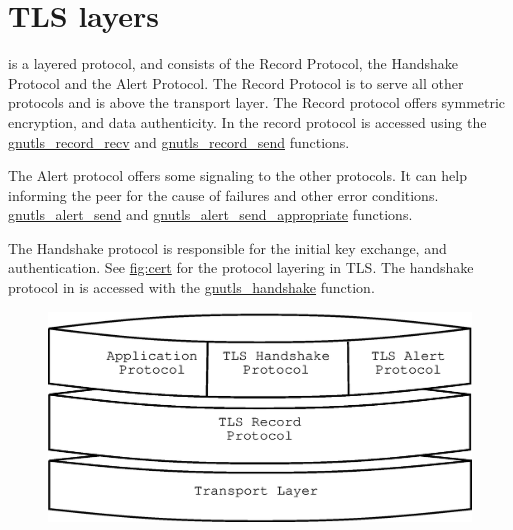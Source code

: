 \newpage
\section{TLS layers}

\tlsI{} is a layered protocol, and consists of the Record Protocol,
the Handshake Protocol and the Alert Protocol. The Record Protocol
is to serve all other protocols and is above the transport layer.
The Record protocol offers symmetric encryption, and data authenticity.
In \gnutls{} the record protocol is accessed using the 
\hyperref{gnutls\_record\_recv()}{gnutls\_record\_recv() (see Section }{)}{gnutls_record_recv} and
\hyperref{gnutls\_record\_send()}{gnutls\_record\_send() (see Section }{)}{gnutls_record_send}
functions.

\par
The Alert protocol offers some signaling to the other protocols. It can
help informing the peer for the cause of failures and other error
conditions.
\hyperref{gnutls\_alert\_send()}{gnutls\_alert\_send() (see Section }{)}{gnutls_alert_send} and
\hyperref{gnutls\_alert\_send\_appropriate()}{gnutls\_alert\_send\_appropriate() (see Section }{)}{gnutls_alert_send_appropriate} 
functions.

\par 
The Handshake protocol is responsible for the initial key exchange,
and authentication. See \hyperref{figure}{figure }{}{fig:cert} for the
protocol layering in TLS. The handshake protocol in \gnutls{} is accessed
with the 
\hyperref{gnutls\_handshake()}{gnutls\_handshake() (see Section }{)}{gnutls_handshake} function.

\begin{figure}[hbtp]
\includegraphics{layers}
\label{fig:layers}

\end{figure}


\addvspace{1.5cm}

